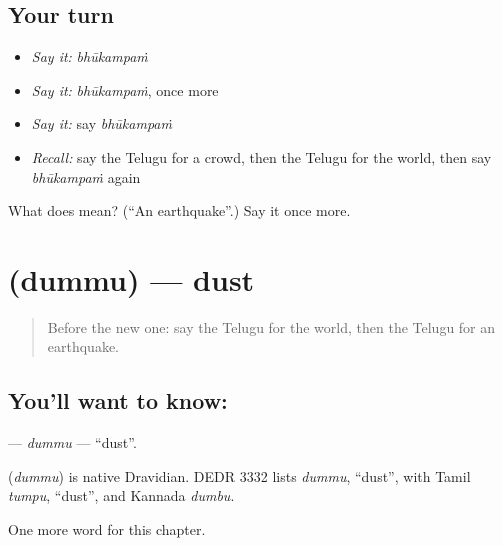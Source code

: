 \subsection*{Your turn}
\begin{itemize}
\raggedright
  \item \emph{Say it:} \emph{bhūkampaṁ}
  \item \emph{Say it:} \emph{bhūkampaṁ}, once more
  \item \emph{Say it:} say \emph{bhūkampaṁ}
  \item \emph{Recall:} say the Telugu for a crowd, then the Telugu for the world, then say \emph{bhūkampaṁ} again
\end{itemize}

\begin{tcolorbox}[breakable,colback=teal!4,colframe=teal!35!black,title={Before you move on}]
What does  mean? (\textquotedblleft{}An earthquake\textquotedblright{}.) Say it once more.
\end{tcolorbox}
\section[\texorpdfstring{\te{దుమ్ము} (dummu)}{దుమ్ము (dummu)}]{ (dummu) — dust}

\label{lesson:TE-C175-dummu}



\begin{quote}
Before the new one: say the Telugu for the world, then the Telugu for an earthquake.
\end{quote}

\subsection*{You'll want to know: }
\textbf{} — \emph{dummu} — \textquotedblleft{}dust\textquotedblright{}.

\begin{cousinweb}
\textbf{} (\emph{dummu}) is native Dravidian. DEDR 3332 lists \emph{dummu}, \textquotedblleft{}dust\textquotedblright{}, with Tamil \emph{tumpu}, \textquotedblleft{}dust\textquotedblright{}, and Kannada \emph{dumbu}.
\end{cousinweb}

\begin{grammarlens}[title={What you've built}]
One more word for this chapter.
\end{grammarlens}

